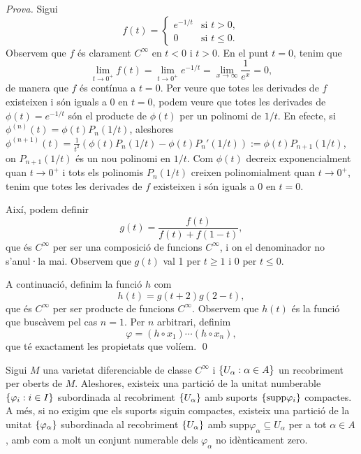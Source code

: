 {\color{green!50!black} 
    \textit{Prova.} 
    Sigui
    \begin{equation*}
        f(t) = \begin{cases}
            e^{-1/t} & \text{si } t > 0, \\
            0 & \text{si } t\le 0.
        \end{cases}
    \end{equation*}
    Observem que $f$ és clarament $C^\infty$ en $t<0$ i $t>0$. En el punt $t=0$, tenim que
    \begin{equation*}
        \lim_{t\to0^+} f(t) = \lim_{t\to0^+} e^{-1/t} = \lim_{x\to\infty} \frac{1}{e^x} = 0,
    \end{equation*}
    de manera que $f$ és contínua a $t=0$. Per veure que totes les derivades de $f$ existeixen i són iguals a $0$ en $t=0$, podem veure que totes les derivades de $\phi(t) = e^{-1/t}$ són el producte de $\phi(t)$ per un polinomi de $1/t$. En efecte, si $\phi^{(n)}(t) = \phi(t)P_n(1/t)$, aleshores $\phi^{(n+1)}(t) = \frac{1}{t^2}(\phi(t)P_n(1/t) - \phi(t)P_n'(1/t)) := \phi(t)P_{n+1}(1/t)$, on $P_{n+1}(1/t)$ és un nou polinomi en $1/t$. Com $\phi(t)$ decreix exponencialment quan $t\to0^+$ i tots els polinomis $P_n(1/t)$ creixen polinomialment quan $t\to0^+$, tenim que totes les derivades de $f$ existeixen i són iguals a $0$ en $t=0$.

    Així, podem definir
    \begin{equation*}
        g(t) = \frac{f(t)}{f(t) + f(1-t)},
    \end{equation*}
    que és $C^\infty$ per ser una composició de funcions $C^\infty$, i on el denominador no s'anul·la mai. Observem que $g(t)$ val 1 per $t\ge1$ i 0 per $t\le0$.

    A continuació, definim la funció $h$ com
    \begin{equation*}
        h(t) = g(t+2)g(2-t),
    \end{equation*}
    que és $C^\infty$ per ser producte de funcions $C^\infty$. Observem que $h(t)$ és la funció que buscàvem pel cas $n=1$. Per $n$ arbitrari, definim 
    \begin{equation}\label{eq:phi}
        \varphi = (h\circ x_1)\cdots(h\circ x_n),
    \end{equation}
    que té exactament les propietats que volíem.
    \qed
}

\begin{teo}

    Sigui $M$ una varietat diferenciable de classe $C^\infty$ i $\{U_\alpha:\alpha\in A\}$ un recobriment per oberts de $M$. Aleshores, existeix una partició de la unitat numberable $\{\varphi_i:i\in I\}$ subordinada al recobriment $\{U_\alpha\}$ amb suports $\{\text{supp}\varphi_i\}$ compactes. A més, si no exigim que els suports siguin compactes, existeix una partició de la unitat $\{\varphi_\alpha\}$ subordinada al recobriment $\{U_\alpha\}$ amb $\text{supp}\varphi_\alpha \subseteq U_\alpha$ per a tot $\alpha\in A$, amb com a molt un conjunt numerable dels $\varphi_\alpha$ no idènticament zero.
\end{teo}

